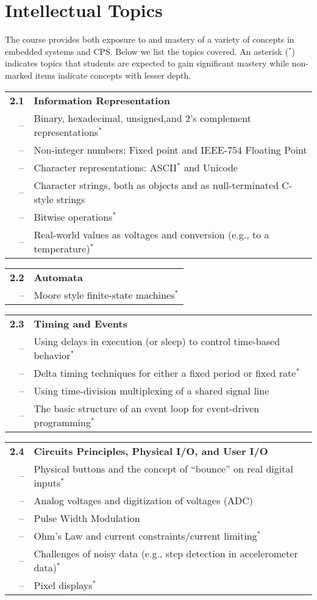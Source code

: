 \section{Intellectual Topics}\label{sec:topics}
The course provides both exposure to and mastery of a variety of concepts
in embedded systems and CPS.  Below we list the topics covered.
An asterisk ($^*$) indicates topics that students are expected to gain significant mastery
while non-marked items indicate concepts with lesser depth.



\noindent
\begin{tabular}{r l}
{\bf 2.1} & {\bf Information Representation} \\
-- & Binary, hexadecimal, unsigned,and 2's complement representations$^*$ \\
-- & Non-integer numbers: Fixed point and IEEE-754 Floating Point \\
-- & Character representations: ASCII$^*$ and Unicode \\
-- & Character strings, both as objects and as null-terminated C-style strings \\
-- &  Bitwise operations$^*$ \\
-- & Real-world values as voltages and conversion (e.g., to a temperature)$^*$
\end{tabular}

\noindent
\begin{tabular}{r l}
{\bf 2.2} & {\bf Automata}\\
-- & Moore style finite-state machines$^*$
\end{tabular}

\noindent
\begin{tabular}{r l}
{\bf 2.3} & {\bf Timing and Events} \\
-- & Using delays in execution (or sleep) to control time-based behavior$^*$ \\
-- & Delta timing techniques for either a fixed period or fixed rate$^*$ \\
-- & Using time-division multiplexing of a shared signal line \\
-- & The basic structure of an event loop for event-driven programming$^*$
\end{tabular}

\noindent
\begin{tabular}{r l}
{\bf 2.4} & {\bf Circuits Principles, Physical I/O, and User I/O} \\
-- & Physical buttons and the concept of ``bounce'' on real digital inputs$^*$ \\
-- & Analog voltages and digitization of voltages (ADC) \\
-- & Pulse Width Modulation \\
-- & Ohm's Law and current constraints/current limiting$^*$ \\
-- & Challenges of noisy data (e.g., step detection in accelerometer data)$^*$ \\
-- & Pixel displays$^*$
\end{tabular}

